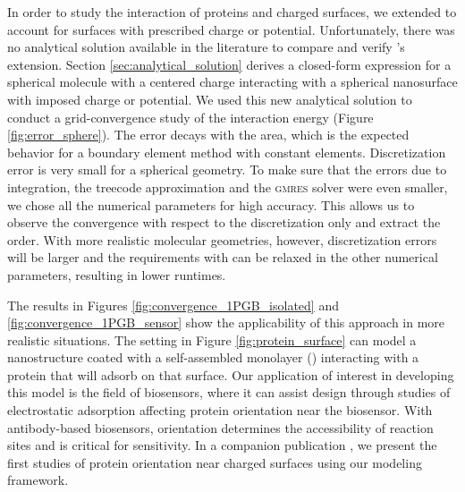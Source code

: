 
In order to study the interaction of proteins and charged surfaces, we extended \pygbe to account for surfaces with prescribed charge or potential. Unfortunately, there was no analytical solution available in the literature to compare and verify \pygbe's extension. 
Section \ref{sec:analytical_solution} derives a closed-form expression for a spherical molecule with a centered charge interacting with a spherical nanosurface with imposed charge or potential.
We used this new analytical solution to conduct a grid-convergence study of the interaction energy (Figure \ref{fig:error_sphere}). The error decays with the area, which is the expected behavior \cite{CooperBardhanBarba2013, CooperBarba-share154331} for a boundary element method with constant elements. 
Discretization error is very small for a spherical geometry. To make sure that the errors due to integration, the treecode approximation and the \textsc{gmres} solver were even smaller, we chose all the numerical parameters for high accuracy. This allows us to observe the convergence with respect to the discretization only and extract the order. With more realistic molecular geometries, however, discretization errors will be larger and the requirements with \pygbe can be relaxed in the other numerical parameters, resulting in lower runtimes.


The results in Figures \ref{fig:convergence_1PGB_isolated} and \ref{fig:convergence_1PGB_sensor} show the applicability of this approach in more realistic situations. The setting in Figure \ref{fig:protein_surface} can model a nanostructure coated with a self-assembled monolayer (\sam) interacting with a protein that will adsorb on that surface. Our application of interest in developing this model is the field of biosensors, where it can assist design through studies of electrostatic adsorption affecting protein orientation near the biosensor. With antibody-based biosensors, orientation determines the accessibility of reaction sites and is critical for sensitivity. In a companion publication \cite{CooperBarba2015b}, we present the first studies of protein orientation near charged surfaces using our modeling framework.

